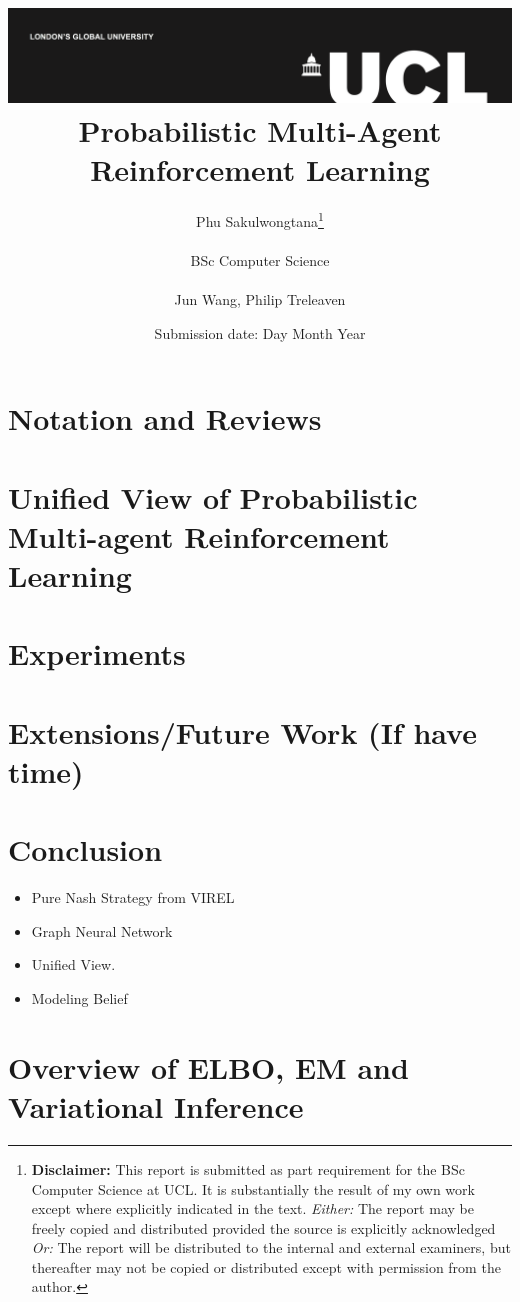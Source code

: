 \documentclass{report}
\title{{\vspace{-14em} \includegraphics[scale=0.4]{ucl_logo.png}}\\
{{\Huge Probabilistic Multi-Agent Reinforcement Learning}}\\
}
\date{Submission date: Day Month Year}
\author{Phu Sakulwongtana\thanks{
{\bf Disclaimer:}
This report is submitted as part requirement for the BSc Computer Science at UCL. It is
substantially the result of my own work except where explicitly indicated in the text.
\emph{Either:} The report may be freely copied and distributed provided the source is explicitly acknowledged
\newline  %
\emph{Or:}\newline
The report will be distributed to the internal and external examiners, but thereafter may not be copied or distributed except with permission from the author.}
\\ \\
BSc Computer Science\\ \\
Jun Wang, Philip Treleaven}
\begin{document}
 
\onehalfspacing
\maketitle
\begin{abstract}

\end{abstract}

\tableofcontents
\setcounter{page}{1}

\chapter{Notation and Reviews}


\chapter{Unified View of Probabilistic Multi-agent Reinforcement Learning}


% 

\chapter{Experiments}

\chapter{Extensions/Future Work (If have time)}


\chapter{Conclusion}
\begin{itemize}
    \item Pure Nash Strategy from VIREL
    \item Graph Neural Network 
    \item Unified View. 
    \item Modeling Belief 
\end{itemize}


% 



\chapter{Overview of ELBO, EM and Variational Inference}


% 

% 
\end{document}
